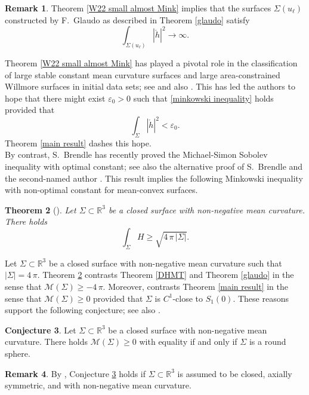 \documentclass[11pt]{amsart}
\newtheorem{theorem}{Theorem}
\theoremstyle {definition}
\newtheorem{remark}[theorem]{Remark}
\newtheorem{conjecture}[theorem]{Conjecture}
\newcommand{\eps}{\varepsilon}
\begin{document}
\begin{remark}
Theorem \ref{W22 small almost Mink} implies that the surfaces $\Sigma(u_\ell)$ constructed by F.\ Glaudo as described in Theorem \ref{glaudo} satisfy $$\int_{\Sigma(u_\ell)} |\mathring{h}|^2 \to \infty.$$
\end{remark}
Theorem \ref{W22 small almost Mink} has played a pivotal role in the classification of large stable constant mean curvature surfaces  and large area-constrained Willmore surfaces in initial data sets; see \cite[Lemma 4.8]{angstnomore} and also \cite[Lemma 9]{EichmairKoerberMetzgerSchulze}. This has led the authors to hope that there might exist $\eps_0>0$ such that \eqref{minkowski inequality} holds  provided that  
\[
\int_{\Sigma} |\mathring{h}|^2 < \eps_0.
\]
Theorem \ref{main result} dashes this hope. \\ \indent By contrast, S.~Brendle \cite{Brendle} has recently proved the Michael-Simon Sobolev inequality \cite[Theorem 2.1]{MichaelSimon} with optimal constant; see also the alternative proof of S.~Brendle and the second-named author \cite{BrendleEichmair}.   This result implies the following Minkowski inequality with non-optimal constant for mean-convex surfaces.     
\begin{theorem}[{\cite[Corollary 2]{Brendle}}]\label{simon theorem} Let $\Sigma\subset \mathbb{R}^3$ be a closed surface with non-negative mean curvature. There holds
	$$
	\int_{\Sigma} H\geq \sqrt{4\,\pi\,|\Sigma|}.
	$$
\end{theorem}
Let $\Sigma\subset\mathbb{R}^3$ be a closed surface with non-negative mean curvature such that $|\Sigma|=4\,\pi$.  Theorem \ref{simon theorem} contrasts Theorem \ref{DHMT} and Theorem \ref{glaudo} in the sense that $\mathcal{M}(\Sigma)\geq-4\,\pi$.  Moreover, \cite[Theorem 2]{GuanLi} contrasts Theorem \ref{main result} in the sense that $\mathcal{M}(\Sigma)\geq 0$ provided that $\Sigma$ is $C^1$-close to $S_1(0)$. These reasons support the following conjecture; see also \cite[p.~2732]{DalphinHenrotMasnouTakahashi}.
\begin{conjecture} \label{mean-convex conjecture} Let $\Sigma\subset \mathbb{R}^3$ be a closed surface with non-negative mean curvature. There holds $\mathcal{M}(\Sigma)\geq 0$  with equality if and only if $\Sigma$ is a round sphere. 
\end{conjecture}
\begin{remark}
	By \cite[Theorem 1.3]{DalphinHenrotMasnouTakahashi}, Conjecture \ref{mean-convex conjecture} holds if $\Sigma\subset \mathbb{R}^3$ is assumed to be closed, axially symmetric, and with non-negative mean curvature. 
\end{remark} 
\end{document}

